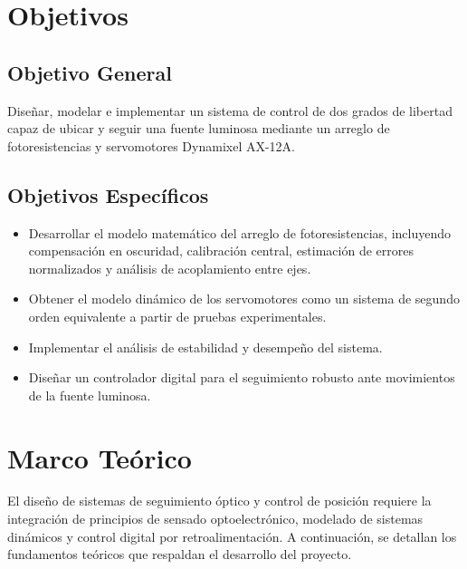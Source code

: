 \documentclass[12pt,a4paper]{article}
\begin{document}
\section{Objetivos}
\subsection{Objetivo General}
Diseñar, modelar e implementar un sistema de control de dos grados de libertad capaz de ubicar y seguir una fuente luminosa mediante un arreglo de fotoresistencias y servomotores Dynamixel AX-12A.

\subsection{Objetivos Específicos}
\begin{itemize}
    \item Desarrollar el modelo matemático del arreglo de fotoresistencias, incluyendo compensación en oscuridad, calibración central, estimación de errores normalizados y análisis de acoplamiento entre ejes.
    \item Obtener el modelo dinámico de los servomotores como un sistema de segundo orden equivalente a partir de pruebas experimentales.
    \item Implementar el análisis de estabilidad y desempeño del sistema.
    \item Diseñar un controlador digital para el seguimiento robusto ante movimientos de la fuente luminosa.
\end{itemize}

\section{Marco Teórico}
El diseño de sistemas de seguimiento óptico y control de posición requiere la integración de principios de sensado optoelectrónico, modelado de sistemas dinámicos y control digital por retroalimentación. A continuación, se detallan los fundamentos teóricos que respaldan el desarrollo del proyecto.
\end{document}
